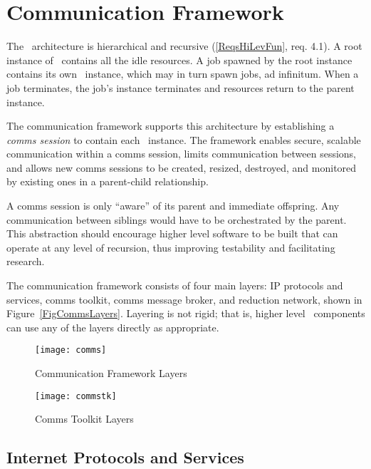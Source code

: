 \section{Communication Framework}\label{SecComms}

The \ngrm\ architecture is hierarchical and recursive
(\ref{ReqsHiLevFun}, req. 4.1).
A root instance of \ngrm\ contains all the
idle resources.  A job spawned by the root instance contains
its own \ngrm\ instance, which may in turn spawn jobs, ad infinitum.
When a job terminates, the job's instance terminates and resources
return to the parent instance.

The communication framework supports this architecture by
establishing a {\em comms session} to contain each \ngrm\ instance.
The framework enables secure, scalable communication
within a comms session, limits communication between sessions,
and allows new comms sessions to be created, resized, destroyed,
and monitored by existing ones in a parent-child relationship.

A comms session is only ``aware'' of its parent and immediate offspring.
Any communication between siblings would have to be orchestrated by
the parent.  This abstraction should encourage higher level software
to be built that can operate at any level of recursion, thus improving
testability and facilitating research.

The communication framework consists of four main layers:
IP protocols and services, comms toolkit, comms message broker, and
reduction network, shown
in Figure~\ref{FigCommsLayers}.  Layering is not rigid;
that is, higher level \ngrm\ components can use any of the
layers directly as appropriate.

\begin{figure}
\begin{minipage}[b]{0.45\linewidth}
\centering
\texttt{[image: comms]}
\caption{Communication Framework Layers}
\label{FigCommsLayers}
\end{minipage}
\hspace{0.5cm}
\begin{minipage}[b]{0.45\linewidth}
\centering
\texttt{[image: commstk]}
\caption{Comms Toolkit Layers}
\label{FigCommsTK}
\end{minipage}
\end{figure}

\subsection{Internet Protocols and Services}
\label{sect:commsIP}

